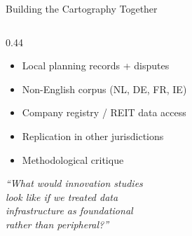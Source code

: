 \documentclass[aspectratio=169,11pt]{beamer}
\newcommand{\iconfull}[2]{\textcolor{#1}{\faIcon{#2}}}
\begin{document}
\begin{frame}{\iconfull{dcblue}{folder-open}\enspace Building the Cartography Together}
\begin{columns}[T]
\begin{column}{0.44\textwidth}
\begin{itemize}
    \item Local planning records + disputes
    \item Non-English corpus (NL, DE, FR, IE)
    \item Company registry / REIT data access
    \item Replication in other jurisdictions
    \item Methodological critique
  \end{itemize}
  \vspace{0.5em}
  \begin{center}
    \small\textit{``What would innovation studies\\
    look like if we treated data\\
    infrastructure as \alert{foundational}\\
    rather than peripheral?''}
  \end{center}
\end{column}
\end{columns}
\end{frame}
\end{document}
